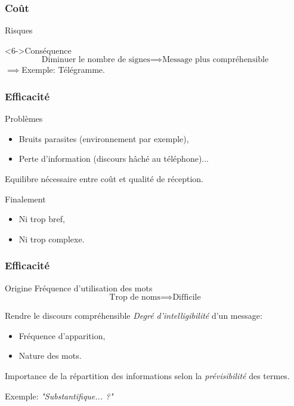 \begin{frame}
	\frametitle{Coût}
	\begin{alertblock}{Risques}
		\centering
	\end{alertblock}
	\begin{exampleblock}<6->{Conséquence}
		\[ \text{Diminuer le nombre de signes} \implies \text{Message plus compréhensible} \]
		$\implies$Exemple: Télégramme.
	\end{exampleblock}
\end{frame}
\begin{frame}
	\frametitle{Efficacité}
	\begin{alertblock}{Problèmes}
		\begin{itemize}
			\item Bruits parasites (environnement par exemple),
			\item Perte d'information (discours hâché au téléphone)...
		\end{itemize}
		Equilibre nécessaire entre coût et qualité de réception.
	\end{alertblock}
	\pause
	\begin{block}{Finalement}
		\begin{itemize}
			\item Ni trop bref,
			\item Ni trop complexe.
		\end{itemize}
	\end{block}
\end{frame}
\begin{frame}
	\frametitle{Efficacité}
	\begin{exampleblock}{Origine}
		Fréquence d'utilisation des mots
		\[ \text{Trop de noms} \implies \text{Difficile} \]
	\end{exampleblock}
	\pause
	\begin{block}{Rendre le discours compréhensible}
		\emph{Degré d'intelligibilité} d'un message:
		\begin{itemize}
			\item Fréquence d'apparition,
			\item Nature des mots.
		\end{itemize} \pause
		Importance de la répartition des informations selon la \emph{prévisibilité} des termes.

		\vspace{0.2cm}
		Exemple: {\itshape"Substantifique... ?"}
	\end{block}
\end{frame}
